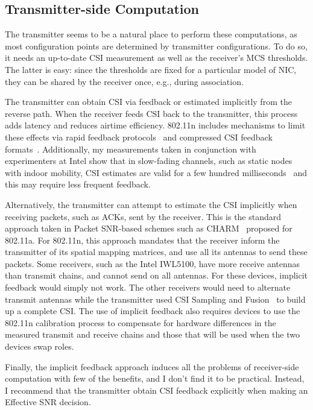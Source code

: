 \subsection{Transmitter-side Computation}
The transmitter seems to be a natural place to perform these computations, as most configuration points are determined by transmitter configurations. To do so, it needs an up-to-date CSI measurement as well as the receiver's MCS thresholds. The latter is easy: since the thresholds are fixed for a particular model of NIC, they can be shared by the receiver once, e.g., during association.

The transmitter can obtain CSI via feedback or estimated implicitly from the reverse path. When the receiver feeds CSI back to the transmitter, this process adds latency and reduces airtime efficiency. 802.11n includes mechanisms to limit these effects via rapid feedback protocols~\cite[\S9.19.2]{80211n} and compressed CSI feedback formats~\cite[\S20.3.12.2.5]{80211n}. Additionally, my measurements taken in conjunction with experimenters at Intel show that in slow-fading channels, such as static nodes with indoor mobility, CSI estimates are valid for a few hundred milliseconds~\cite{Perahia_Doppler} and this may require less frequent feedback.

Alternatively, the transmitter can attempt to estimate the CSI implicitly when receiving packets, such as ACKs, sent by the receiver. This is the standard approach taken in Packet SNR-based schemes such as CHARM~\cite{Judd_CHARM} proposed for 802.11a. For 802.11n, this approach mandates that the receiver inform the transmitter of its spatial mapping matrices, and use all its antennas to send these packets. Some receivers, such as the Intel IWL5100, have more receive antennas than transmit chains, and cannot send on all antennas. For these devices, implicit feedback would simply not work. The other receivers would need to alternate transmit antennas while the transmitter used CSI Sampling and Fusion~\cite{Crepaldi_CSI_SF} to build up a complete CSI. The use of implicit feedback also requires devices to use the 802.11n calibration process to compensate for hardware differences in the measured transmit and receive chains and those that will be used when the two devices swap roles.

Finally, the implicit feedback approach induces all the problems of receiver-side computation with few of the benefits, and I don't find it to be practical. Instead, I recommend that the transmitter obtain CSI feedback explicitly when making an Effective SNR decision.

